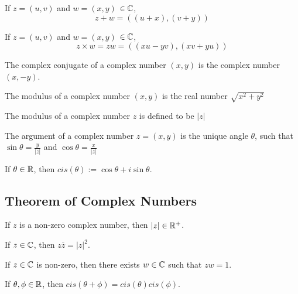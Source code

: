 \documentclass[a4paper]{article}
\begin{document}
\begin{ndefi}[Addition of $\C$]
If $z = (u, v )$ and $w = (x, y)$ $\in \mathbb{C}$,
$$z + w = ((u+x),(v+y))$$
\end{ndefi}

\begin{ndefi}[Multiplication of $\C$]
If $z = (u, v )$ and $w = (x, y)$ $\in \mathbb{C}$,
$$z \times w = zw = ((xu - yv), (xv + yu))$$
\end{ndefi}

\begin{ndefi}[Conjugate]
The complex conjugate of a complex number $(x,y)$ is the complex number $(x,-y)$.
\end{ndefi}

\begin{ndefi}[Modulus]
The modulus of a complex number $(x, y)$ is the real number $\sqrt{x^2 + y^2}$
\end{ndefi}
\begin{notation}
The modulus of a complex number $z$ is defined to be $|z|$
\end{notation}

\begin{ndefi}[Argument]
The argument of a complex number $z = (x, y)$ is the unique angle $\theta$, such that $\sin \theta = \frac{y}{|z|}$ and $\cos \theta = \frac{x}{|z|}$
\end{ndefi}

\begin{ndefi}[cis]
If $\theta \in \mathbb{R}$, then $cis(\theta) := \cos \theta + i \sin \theta$.
\end{ndefi}

\subsection{Theorem of Complex Numbers}
\begin{nthm}[$|z| \in \R^+$]
If $z$ is a non-zero complex number, then $|z| \in \R^+$.
\end{nthm}

\begin{nthm}
If $z \in \mathbb{C}$, then $z\overline{z} = |z|^2$.
\end{nthm}

\begin{nthm}[Inverse]
If $z \in \mathbb{C}$ is non-zero, then there exists $w \in \mathbb{C}$ such that $zw = 1$.
\end{nthm}

\begin{nthm}
If $\theta, \phi \in \mathbb{R}$, then $cis(\theta + \phi) = cis(\theta)cis(\phi)$.
\end{nthm}
\end{document}
